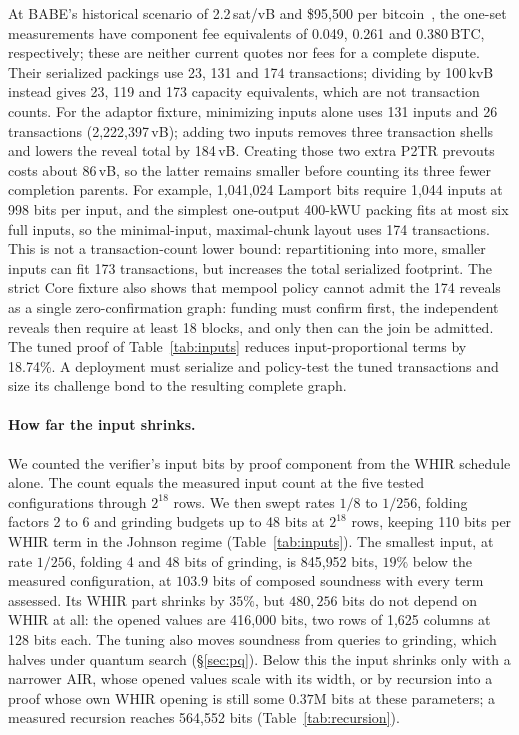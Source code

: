 \documentclass[11pt]{article}
\begin{document}
At BABE's historical scenario of 2.2\,sat/vB and \$95{,}500 per
bitcoin~\cite{babe2026}, the one-set measurements have component fee
equivalents of 0.049, 0.261 and 0.380\,BTC, respectively; these are neither
current quotes nor fees for a complete dispute. Their serialized packings use
23, 131 and 174 transactions; dividing by 100\,kvB instead gives 23, 119 and
173 capacity equivalents, which are not transaction counts. For the adaptor
fixture, minimizing inputs alone uses 131 inputs and 26 transactions
(2{,}222{,}397\,vB); adding two inputs removes three transaction shells and
lowers the reveal total by 184\,vB. Creating those two extra P2TR prevouts costs
about 86\,vB, so the latter remains smaller before counting its three fewer
completion parents.
For example, 1{,}041{,}024 Lamport bits require 1{,}044 inputs at 998 bits per
input, and the simplest one-output 400-kWU packing fits at most six full inputs,
so the minimal-input, maximal-chunk layout uses 174 transactions. This is not a
transaction-count lower bound: repartitioning into more, smaller inputs can fit
173 transactions, but increases the total serialized footprint. The strict
Core fixture also shows that mempool policy cannot admit the 174 reveals as a single
zero-confirmation graph: funding must confirm first, the independent reveals
then require at least 18 blocks, and only then can the join be admitted.
The tuned proof of Table~\ref{tab:inputs} reduces input-proportional terms by
18.74\%. A deployment must serialize and policy-test the tuned transactions and
size its challenge bond to the resulting complete graph.

\paragraph{How far the input shrinks.} We counted the verifier's input bits by
proof component from the WHIR schedule alone. The count equals the measured input
count at the five tested configurations through $2^{18}$ rows. We then swept rates $1/8$ to
$1/256$, folding factors 2 to 6 and grinding budgets up to 48 bits at $2^{18}$
rows, keeping 110 bits per WHIR term in the Johnson regime
(Table~\ref{tab:inputs}). The smallest input, at rate $1/256$, folding 4 and 48
bits of grinding, is 845{,}952 bits, $19\%$ below the measured configuration, at
$103.9$ bits of composed soundness with every term assessed. Its WHIR part
shrinks by $35\%$, but $480{,}256$ bits do not depend on WHIR at all: the opened
values are 416{,}000 bits, two rows of 1{,}625 columns at 128 bits each. The
tuning also moves soundness from queries to grinding, which halves under quantum
search (\S\ref{sec:pq}). Below this the input shrinks only with a narrower AIR,
whose opened values scale with its width, or by recursion into a proof whose own
WHIR opening is still some $0.37$M bits at these parameters; a measured
recursion reaches 564{,}552 bits (Table~\ref{tab:recursion}).
\end{document}
